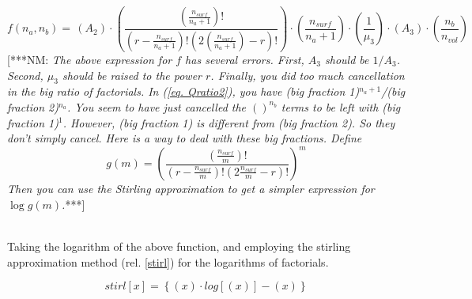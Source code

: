 \documentclass[10pt,letterpaper]{article}
\newcommand{\stirl}[1]{\ensuremath{\left\{\left(#1\right)\cdotp log\left[\left(#1\right)\right]-\left(#1\right)\right\}}}
\begin{document}
\begin{equation}
f(n_a,n_b)=\,
\left(A_2\right)
\cdotp
\left(
\frac{
	\left(
	\frac{
		n_{surf}
	}{
		n_a+1				
	}
	\right)!
}{
	\left(
	r-
	\frac{
		n_{surf}
	}{
		n_a+1				
	}
	\right)!
	\left(
	2
		\left(
			\frac{
				n_{surf}
			}{
				n_a+1				
			}
		\right)	
	-
	r
	\right)!
} 
\right)
\cdotp
\left(
\frac{
	n_{surf}
}{
	n_a+1
}
\right)
\cdotp
\left(
\frac{
	1
}{
	\mu_{3}
}
\right)
\cdot
\left(
A_3
\right)
\cdot
\left(
\frac{
	n_{b}
}{
	n_{vol}	
} 
\right)
\label{fnanb}
\end{equation}
[***NM:  \textit{The above expression for $f$ has several errors.  First, $A_3$ should be $1/A_3$. 
Second, $\mu_3$ should be raised to the power 
$r$.   Finally, you did too much cancellation in the 
big ratio of factorials.  In (\ref{eq. Qratio2}),
you have (big fraction 1)$^{n_a+1}$/(big fraction 2)$^{n_a}$.  You seem to have just cancelled the 
$()^{n_b}$ terms to be left with (big fraction 1)$^1$. However, (big fraction 1) is different from (big 
fraction 2). So they don't simply cancel.  Here is a
way to deal with these big fractions.  Define 
\[ g(m)=  \left( \frac{
\left(\frac{n_{surf}}{m}\right)!}{ 
\left(r-\frac{n_{surf}}{m}\right)! 
\left(2\frac{n_{surf}}{m}-r\right)!}
\right)^m  
\]
Then you can use the Stirling approximation to get a 
simpler expression for $\log g(m)$.}***]


\text{}\\
\noindent Taking the logarithm of the above function,
%
%
and employing the stirling approximation method (rel. \ref{stirl}) for the logarithms of factorials.

\begin{equation}
	stirl[x]=\stirl{x}
	\label{stirl}
\end{equation}
\end{document}
